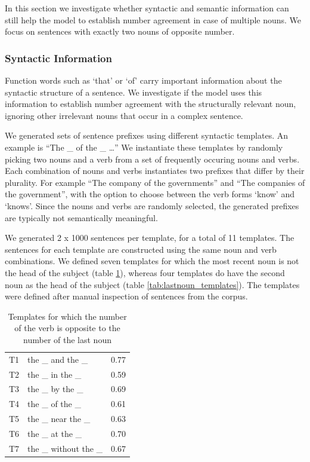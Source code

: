 In this section we investigate whether
syntactic and semantic information
can still help the model 
to establish number agreement
in case of multiple nouns.
We focus on sentences with exactly two nouns
of opposite number.


\subsubsection{Syntactic Information}

Function words such as `that' or `of' carry 
important information about the syntactic structure of a sentence.
We investigate if the model
uses this information to establish number agreement
with the structurally relevant noun, ignoring
other irrelevant nouns that occur in a complex sentence.

We generated sets of sentence prefixes using 
different syntactic templates.
An example is ``The \_ of the \_ \ldots''
We instantiate these templates by randomly
picking two nouns and a verb 
from a set of frequently occuring nouns and verbs. 
Each combination of nouns and verbs instantiates
two prefixes that differ by their plurality.
For example ``The company of the governments''
and ``The companies of the government'',
with the option to choose between the verb forms
`know' and `knows'.
Since the nouns and verbs are randomly selected,
the generated prefixes 
are typically not semantically
meaningful.

We generated 2 x 1000 sentences per template,
for a total of 11 templates.
The sentences for each template are constructed using the same
noun and verb combinations.
We defined seven templates for which the most recent noun is 
not the head of the subject (table \ref{tab:attractor_templates}),
whereas four templates do have the second noun as the head of the subject
(table \ref{tab:lastnoun_templates}).
The templates were defined after manual inspection
of sentences from the corpus.

\begin{table}
\parbox{\linewidth}{
\centering
\begin{tabular}{ l l r }
  T1    & the \_ and the \_     &  0.77 \\
  T2    & the \_ in the \_      &  0.59 \\
  T3    & the \_ by the \_      &  0.69 \\
  T4    & the \_ of the \_      &  0.61 \\
  T5    & the \_ near the \_    &  0.63\\
  T6    & the \_ at the \_      &  0.70\\
  T7    & the \_ without the \_ & 0.67  
\end{tabular}
\caption{Templates for which the number of the verb 
is opposite to the number of the last noun} 
\label{tab:attractor_templates}
}
\end{table}


